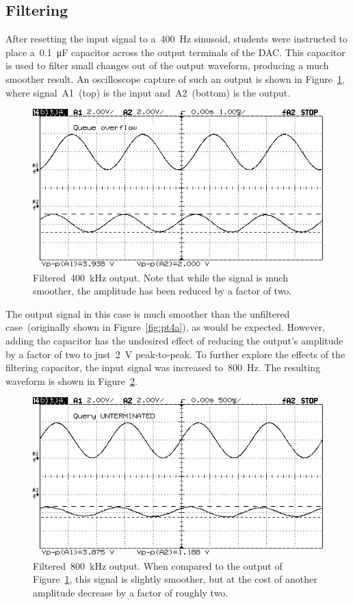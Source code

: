 \subsection{Filtering}
After resetting the input signal to a~\SI{400}{\hertz} sinusoid, students were instructed to place a~\SI{0.1}{\micro\farad} capacitor across the output terminals of the DAC.  This capacitor is used to filter small changes out of the output waveform, producing a much smoother result.  An oscilloscope capture of such an output is shown in Figure~\ref{fig:pt8_400}, where signal~A1~(top) is the input and~A2~(bottom) is the output.
%
\begin{figure}[H]
	\centering
	\includegraphics[width=.6\textwidth]{img/shot/pt8_400_cap.png}
	\parbox{.6\textwidth}{
	\caption[Filtering --- \SI{400}{\hertz} Sinusoid]{Filtered~\SI{400}{\kilo\hertz} output.  Note that while the signal is much smoother, the amplitude has been reduced by a factor of two.}
	\label{fig:pt8_400}}
\end{figure}
%
The output signal in this case is much smoother than the unfiltered case~(originally shown in Figure~\ref{fig:pt4a}), as would be expected.  However, adding the capacitor has the undesired effect of reducing the output's amplitude by a factor of two to just~\SI{2}{\volt} peak-to-peak.  To further explore the effects of the filtering capacitor, the input signal was increased to~\SI{800}{\hertz}.  The resulting waveform is shown in Figure~\ref{fig:pt8_800}.
%
\begin{figure}[H]
	\centering
	\includegraphics[width=.6\textwidth]{img/shot/pt8_800_cap.png}
	\parbox{.6\textwidth}{
	\caption[Filtering --- \SI{800}{\hertz} Sinusoid]{Filtered~\SI{800}{\kilo\hertz} output.  When compared to the output of Figure~\ref{fig:pt8_400}, this signal is slightly smoother, but at the cost of another amplitude decrease by a factor of roughly two.}
	\label{fig:pt8_800}}
\end{figure}
